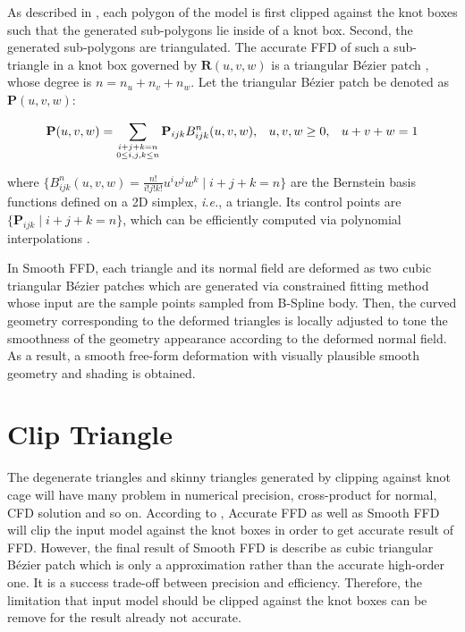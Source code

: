 \documentclass[3p]{elsarticle}
\begin{document}
As described in \cite{Feng98, Feng00, Cui14}, each polygon of the model is first clipped against the knot boxes such
that the generated sub-polygons lie inside of a knot box. Second, the generated sub-polygons are triangulated. The
accurate FFD of such a sub-triangle in a knot box governed by $\mathbf R(u,v,w)$ is a triangular B\'ezier patch
\cite{Feng98, Feng00}, whose degree is $n=n_u+n_v+n_w$. Let the triangular B\'ezier patch be denoted as ${\mathbf
P}(u,v,w)$:

\begin{equation}
	\footnotesize
	{\mathbf P}(u,v,w)
	= \sum_{\substack{i+j+k=n \\ 0\leq i,j,k\leq n}} {\mathbf P}_{ijk}B^n_{ijk}(u,v,w), \hspace{8 pt} u,v,w\ge0,
		\hspace{8 pt}u+v+w=1
	\label{equ:Puvw}
\end{equation}

\noindent where $\{B_{ijk}^n(u,v,w)=\frac{n!}{i!j!k!}u^iv^jw^k \mid i+j+k=n\}$ are the Bernstein basis functions
defined on a 2D simplex, \textit{i.e.}, a triangle. Its control points are $\{\mathbf P_{ijk} \mid i+j+k=n\}$, which
can be efficiently computed via polynomial interpolations \cite{Feng00}.

In Smooth FFD, each triangle and its normal field are deformed as two cubic triangular Bézier patches which are generated via constrained fitting method whose input are the sample points  sampled from B-Spline body. Then, the curved geometry corresponding to the deformed triangles is locally adjusted to tone the smoothness of the geometry appearance according to the deformed normal field. As a result, a smooth free-form deformation with visually plausible smooth geometry and shading is obtained.

\section{Clip Triangle}
The degenerate triangles and skinny triangles generated by clipping against knot cage will have many problem in numerical precision, cross-product for normal, CFD solution and so on.
According to \cite{Feng98, Feng00}, Accurate FFD as well as Smooth FFD will clip the input model against the knot boxes in order to get accurate result of FFD. However, the final result of Smooth FFD is describe as cubic triangular Bézier patch which is only a approximation rather than the accurate high-order one. It is a success trade-off between precision and efficiency. Therefore, the limitation that input model should be clipped against the knot boxes can be remove for the result already not accurate.
\end{document}
